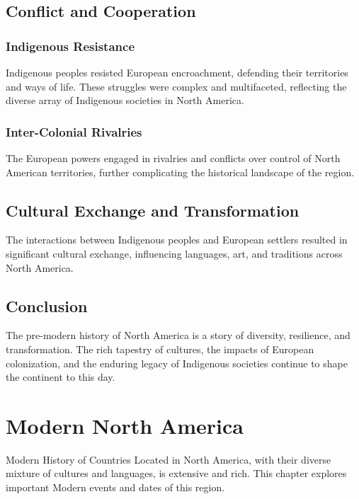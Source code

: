 \documentclass[a4paper,12pt]{book}
\begin{document}
\section{Conflict and Cooperation}
\label{sec:conflict-cooperation}

\subsection{Indigenous Resistance}
Indigenous peoples resisted European encroachment, defending their territories and ways of life. These struggles were complex and multifaceted, reflecting the diverse array of Indigenous societies in North America.

\subsection{Inter-Colonial Rivalries}
The European powers engaged in rivalries and conflicts over control of North American territories, further complicating the historical landscape of the region.

\section{Cultural Exchange and Transformation}
\label{sec:cultural-exchange-transformation}
The interactions between Indigenous peoples and European settlers resulted in significant cultural exchange, influencing languages, art, and traditions across North America.

\section{Conclusion}
\label{sec:conclusion-north-america}
The pre-modern history of North America is a story of diversity, resilience, and transformation. The rich tapestry of cultures, the impacts of European colonization, and the enduring legacy of Indigenous societies continue to shape the continent to this day.

\chapter{Modern North America}
\label{ch:modern-history-north-america}

Modern History of Countries Located in North America, with their diverse mixture of cultures and languages, is extensive and rich. This chapter explores important Modern events and dates of this region.
\end{document}
